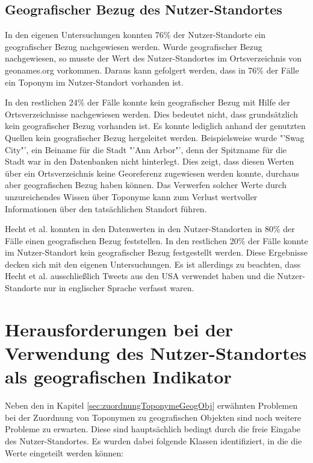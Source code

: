 		\subsection{Geografischer Bezug des Nutzer-Standortes} 
			
			In den eigenen Untersuchungen konnten 76\% der Nutzer-Standorte ein geografischer Bezug nachgewiesen werden. 
			Wurde geografischer Bezug nachgewiesen, so musste der Wert des Nutzer-Standortes im Ortsverzeichnis von geonames.org vorkommen. 
			Daraus kann gefolgert werden, dass in 76\% der Fälle ein Toponym im Nutzer-Standort vorhanden ist.
			
			In den restlichen 24\% der Fälle konnte kein geografischer Bezug mit Hilfe der Ortsverzeichnisse nachgewiesen werden. 
			Dies bedeutet nicht, dass grundsätzlich kein geografischer Bezug vorhanden ist. 
			Es konnte lediglich anhand der genutzten Quellen kein geografischer Bezug hergeleitet werden.
			Beispielsweise wurde "'Swag City"', ein Beiname für die Stadt "'Ann Arbor"', denn der Spitzname für die Stadt war in den Datenbanken nicht hinterlegt. 
			Dies zeigt, dass diesen Werten über ein Ortsverzeichnis keine Georeferenz zugewiesen werden konnte, durchaus aber geografischen Bezug haben können.
			Das Verwerfen solcher Werte durch unzureichendes Wissen über Toponyme kann zum Verlust wertvoller Informationen über den tatsächlichen Standort führen.

			Hecht et al. konnten in \cite{Hecht2011} den Datenwerten in den Nutzer-Standorten in 80\% der Fälle einen geografischen Bezug feststellen.
			In den restlichen 20\% der Fälle konnte im Nutzer-Standort kein geografischer Bezug festgestellt werden. 
			Diese Ergebnisse decken sich mit den eigenen Untersuchungen. 
			Es ist allerdings zu beachten, dass Hecht et al. ausschließlich Tweets aus den USA verwendet haben und die Nutzer-Standorte nur in englischer Sprache verfasst waren. 
					
	\section{Herausforderungen bei der Verwendung des Nutzer-Standortes als geografischen Indikator} \label{sec:HerausforderungenBeiDerVerwendungDesNutzerStadortes}  

		Neben den in Kapitel \ref{sec:zuordnungToponymeGeogObj} erwähnten Problemen bei der Zuordnung von Toponymen zu geografischen Objekten sind noch weitere Probleme zu erwarten.
		Diese sind hauptsächlich bedingt durch die freie Eingabe des Nutzer-Standortes.
		Es wurden dabei folgende Klassen identifiziert, in die die Werte eingeteilt werden können:

